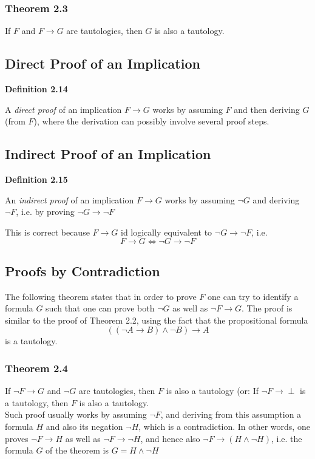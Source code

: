 \documentclass[a4paper]{report}
\newenvironment{definition}[1]{\begin{framed}\centerline{\textbf{Definition #1}}\noindent\hspace{-1.1mm}}{\end{framed}}
\begin{document}
\subsubsection*{Theorem 2.3}
If $F$ and $F\to G$ are tautologies, then $G$ is also a tautology. 

\subsection{Direct Proof of an Implication}
\begin{definition}{2.14}
A \emph{direct proof} of an implication $F\to G$ works by assuming $F$ and then deriving $G$ (from $F$), where the derivation can possibly involve several proof steps. 
\end{definition}
\subsection{Indirect Proof of an Implication}
\begin{definition}{2.15}
An \emph{indirect proof} of an implication $F\to G$ works by assuming $\lnot G$ and deriving $\lnot F$, i.e. by proving $\lnot G\to \lnot F$
\end{definition}
This is correct because $F\to G$ id logically equivalent to $\lnot G\to\lnot F$, i.e. \[F\to G\Longleftrightarrow \lnot G\to\lnot F\]

\subsection{Proofs by Contradiction}
The following theorem states that in order to prove $F$ one can try to identify a formula $G$ such that one can prove both $\lnot G$ as well as $\lnot F\to G$. The proof is similar to the proof of Theorem 2.2, using the fact that the propositional formula 
\[\left( (\lnot A\to B)\land \lnot B\right)\to A\]
is a tautology.
\subsubsection*{Theorem 2.4}
If $\lnot F\to G$ and $\lnot G$ are tautologies, then $F$ is also a tautology (or: If $\lnot F \to\perp$ is a tautology, then $F$ is also a tautology. \\

Such proof usually works by assuming $\lnot F$, and deriving from this assumption a formula $H$ and also its negation $\lnot H$, which is a contradiction. In other words, one proves $\lnot F\to H$ as well as $\lnot F\to \lnot H$, and hence also $\lnot F\to (H\land\lnot H)$, i.e. the formula $G$ of the theorem is $G=H\land \lnot H$
\end{document}
